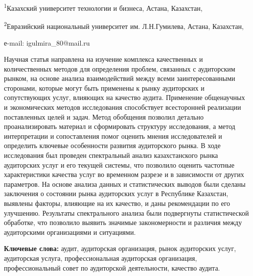\begin{affiliation}

\textsuperscript{1}Казахский университет технологии и бизнеса, Астана,
Казахстан,

\textsuperscript{2}Евразийский национальный университет им.
Л.Н.Гумилева, Астана, Казахстан,

е-mail: igulmira\_80@mail.ru
\end{affiliation}

Научная статья направлена на изучение комплекса качественных и
количественных методов для определения проблем, связанных с аудиторским
рынком, на основе анализа взаимодействий между всеми заинтересованными
сторонами, которые могут быть применены к рынку аудиторских и
сопутствующих услуг, влияющих на качество аудита. Применение общенаучных
и экономических методов исследования способствует всесторонней
реализации поставленных целей и задач. Метод обобщения позволил детально
проанализировать материал и сформировать структуру исследования, а метод
интерпретации и сопоставления помог оценить мнения исследователей и
определить ключевые особенности развития аудиторского рынка. В ходе
исследования был проведен спектральный анализ казахстанского рынка
аудиторских услуг и его текущей системы, что позволило оценить частотные
характеристики качества услуг во временном разрезе и в зависимости от
других параметров. На основе анализа данных и статистических выводов
были сделаны заключения о состоянии рынка аудиторских услуг в Республике
Казахстан, выявлены факторы, влияющие на их качество, и даны
рекомендации по его улучшению. Результаты спектрального анализа были
подвергнуты статистической обработке, что позволило выявить значимые
закономерности и различия между аудиторскими организациями и ситуациями.

\textbf{Ключевые слова:} аудит, аудиторская организация, рынок
аудиторских услуг, аудиторская услуга, профессиональная аудиторская
организация, профессиональный совет по аудиторской деятельности,
качество аудита. 

